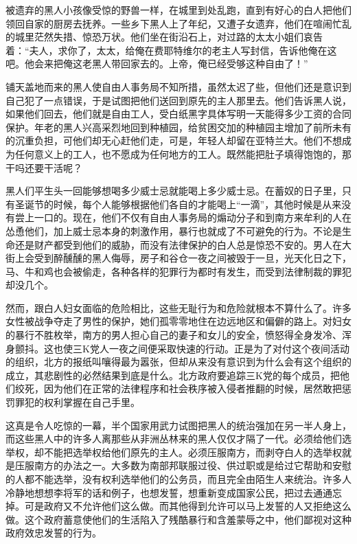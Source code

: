 \par 被遗弃的黑人小孩像受惊的野兽一样，在城里到处乱跑，直到有好心的白人把他们领回自家的厨房去抚养。一些乡下黑人上了年纪，又遭子女遗弃，他们在喧闹忙乱的城里茫然失措、惊恐万状。他们坐在街沿石上，对过路的太太小姐们哀告着：“夫人，求你了，太太，给俺在费耶特维尔的老主人写封信，告诉他俺在这吧。他会来把俺这老黑人带回家去的。上帝，俺已经受够这种自由了！”
\par 铺天盖地而来的黑人使自由人事务局不知所措，虽然太迟了些，但他们还是意识到自己犯了一点错误，于是试图把他们送回到原先的主人那里去。他们告诉黑人说，如果他们回去，他们就是自由工人，受白纸黑字具体写明一天能得多少工资的合同保护。年老的黑人兴高采烈地回到种植园，给贫困交加的种植园主增加了前所未有的沉重负担，可他们却无心赶他们走，可是，年轻人却留在亚特兰大。他们不想成为任何意义上的工人，也不愿成为任何地方的工人。既然能把肚子填得饱饱的，那干吗还要干活呢？
\par 黑人们平生头一回能够想喝多少威士忌就能喝上多少威士忌。在蓄奴的日子里，只有圣诞节的时候，每个人能够根据他们各自的才能喝上“一滴”，其他时候是从来没有尝上一口的。现在，他们不仅有自由人事务局的煽动分子和到南方来牟利的人在怂恿他们，加上威士忌本身的刺激作用，暴行也就成了不可避免的行为。不论是生命还是财产都受到他们的威胁，而没有法律保护的白人总是惊恐不安的。男人在大街上会受到醉醺醺的黑人侮辱，房子和谷仓一夜之间被毁于一旦，光天化日之下，马、牛和鸡也会被偷走，各种各样的犯罪行为都时有发生，而受到法律制裁的罪犯却没几个。
\par 然而，跟白人妇女面临的危险相比，这些无耻行为和危险就根本不算什么了。许多女性被战争夺走了男性的保护，她们孤零零地住在边远地区和偏僻的路上。对妇女的暴行不胜枚举，南方的男人担心自己的妻子和女儿的安全，愤怒得全身发冷、浑身颤抖。这也使三K党人一夜之间便采取快速的行动。正是为了对付这个夜间活动的组织，北方的报纸叫嚷得最为嚣张，但却从来没有意识到为什么会有这个组织的成立，其悲剧性的必然结果到底是什么。北方政府要追踪三K党的每个成员，把他们绞死，因为他们在正常的法律程序和社会秩序被入侵者推翻的时候，居然敢把惩罚罪犯的权利掌握在自己手里。
\par 这真是令人吃惊的一幕，半个国家用武力试图把黑人的统治强加在另一半人身上，而这些黑人中的许多人离那些从非洲丛林来的黑人仅仅才隔了一代。必须给他们选举权，却不能把选举权给他们原先的主人。必须压服南方，而剥夺白人的选举权就是压服南方的办法之一。大多数为南部邦联服过役、供过职或是给过它帮助和安慰的人都不能选举，没有权利选举他们的公务员，而且完全由陌生人来统治。许多人冷静地想想李将军的话和例子，也想发誓，想重新变成国家公民，把过去通通忘掉。可是政府又不允许他们这么做。而其他得到允许可以马上发誓的人又拒绝这么做。这个政府蓄意使他们的生活陷入了残酷暴行和含羞蒙辱之中，他们鄙视对这种政府效忠发誓的行为。
